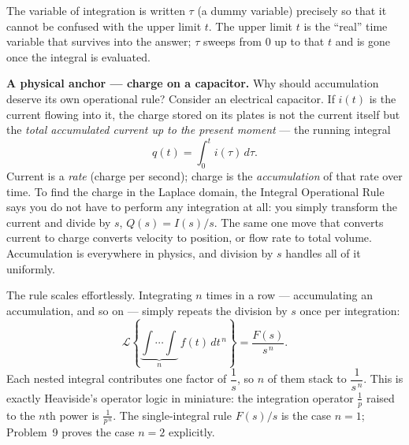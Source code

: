 \documentclass[11pt]{article}
\begin{document}
\noindent The variable of integration is written $\tau$ (a dummy variable) precisely so that it cannot be confused with the upper limit $t$. The upper limit $t$ is the ``real'' time variable that survives into the answer; $\tau$ sweeps from $0$ up to that $t$ and is gone once the integral is evaluated.

\smallskip
\noindent\textbf{A physical anchor --- charge on a capacitor.} Why should accumulation deserve its own operational rule? Consider an electrical capacitor. If $i(t)$ is the current flowing into it, the charge stored on its plates is not the current itself but the \emph{total accumulated current up to the present moment} --- the running integral
\[ q(t) = \int_0^t i(\tau)\,d\tau. \]
Current is a \emph{rate} (charge per second); charge is the \emph{accumulation} of that rate over time. To find the charge in the Laplace domain, the Integral Operational Rule says you do not have to perform any integration at all: you simply transform the current and divide by $s$, $Q(s) = I(s)/s$. The same one move that converts current to charge converts velocity to position, or flow rate to total volume. Accumulation is everywhere in physics, and division by $s$ handles all of it uniformly.

\begin{conceptbox}
The rule scales effortlessly. Integrating $n$ times in a row --- accumulating an accumulation, and so on --- simply repeats the division by $s$ once per integration:
\[ \mathcal{L}\!\left\{\underbrace{\int\!\cdots\!\int}_{n}\, f(t)\,dt^{\,n}\right\} = \frac{F(s)}{s^{\,n}}. \]
Each nested integral contributes one factor of $\dfrac{1}{s}$, so $n$ of them stack to $\dfrac{1}{s^{\,n}}$. This is exactly \textcolor{accentorange}{Heaviside's operator logic} in miniature: the integration operator $\tfrac{1}{p}$ raised to the $n$th power is $\tfrac{1}{p^{\,n}}$. The single-integral rule $F(s)/s$ is the case $n = 1$; Problem~9 proves the case $n = 2$ explicitly.
\end{conceptbox}
\end{document}
